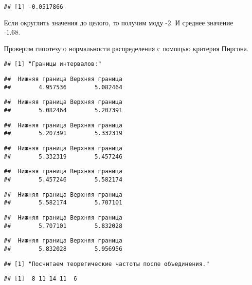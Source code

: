 \documentclass[,]{article}
\begin{document}
\begin{verbatim}
## [1] -0.0517866
\end{verbatim}

Если округлить значения до целого, то получим моду -2. И среднее
значение -1.68.

Проверим гипотезу о нормальности распределения с помощью критерия
Пирсона.

\begin{verbatim}
## [1] "Границы интервалов:"
\end{verbatim}

\begin{verbatim}
##  Нижняя граница Верхняя граница 
##        4.957536        5.082464
\end{verbatim}

\begin{verbatim}
##  Нижняя граница Верхняя граница 
##        5.082464        5.207391
\end{verbatim}

\begin{verbatim}
##  Нижняя граница Верхняя граница 
##        5.207391        5.332319
\end{verbatim}

\begin{verbatim}
##  Нижняя граница Верхняя граница 
##        5.332319        5.457246
\end{verbatim}

\begin{verbatim}
##  Нижняя граница Верхняя граница 
##        5.457246        5.582174
\end{verbatim}

\begin{verbatim}
##  Нижняя граница Верхняя граница 
##        5.582174        5.707101
\end{verbatim}

\begin{verbatim}
##  Нижняя граница Верхняя граница 
##        5.707101        5.832028
\end{verbatim}

\begin{verbatim}
##  Нижняя граница Верхняя граница 
##        5.832028        5.956956
\end{verbatim}

\begin{verbatim}
## [1] "Посчитаем теоретические частоты после объединения."
\end{verbatim}

\begin{verbatim}
## [1]  8 11 14 11  6
\end{verbatim}
\end{document}
